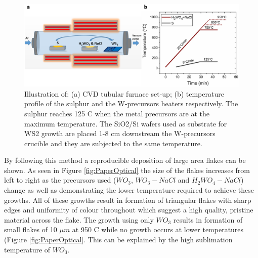 \documentclass[12pt]{article}
\begin{document}
\begin{figure}[h]
\begin{center}
\includegraphics[scale=0.3]{PaperSIFurnace.png}
\caption{Illustration of: (a) CVD tubular furnace set-up; (b) temperature profile of the sulphur and the W-precursors heaters respectively. The sulphur reaches 125 {\degree}C when the metal precursors are at the maximum temperature. The SiO2/Si wafers used as substrate for WS2 growth are placed 1-8 cm downstream the W-precursors crucible and they are subjected to the same temperature.}
\label{fig:PaperSIFurnace}
\end{center}
\end{figure} By following this method a reproducible deposition of large area flakes can be shown. As seen in Figure \ref{fig:PaperOptical} the size of the flakes increases from left to right as the precursors used ($WO_3$, $WO_3-NaCl$ and $H_2WO_4-NaCl$) change as well as demonstrating the lower temperature required to achieve these growths. All of these growths result in formation of triangular flakes with sharp edges and uniformity of colour throughout which suggest a high quality, pristine material across the flake. 
The growth using only $WO_3$ results in formation of small flakes of 10 $\mu m$ at 950 {\degree}C while no growth occurs at lower temperatures (Figure \ref{fig:PaperOptical}. This can be explained by the high sublimation temperature of $WO_3$.
\end{document}
